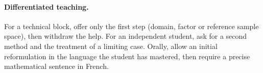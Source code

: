 \paragraph{Differentiated teaching.} For a technical block, offer only the first step (domain, factor or reference sample space), then withdraw the help. For an independent student, ask for a second method and the treatment of a limiting case. Orally, allow an initial reformulation in the language the student has mastered, then require a precise mathematical sentence in French.
